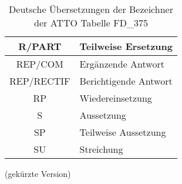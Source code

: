 \begin{table}[h]
\begin{tabular}{|c|l|}
            R/PART & Teilweise Ersetzung \\\hline
            REP/COM & Ergänzende Antwort \\\hline
            REP/RECTIF & Berichtigende Antwort \\\hline
            RP & Wiedereinsetzung \\\hline
            S & Aussetzung \\\hline
            SP & Teilweise Aussetzung \\\hline
            SU & Streichung \\\hline
        \end{tabular}
        \caption{Deutsche Übersetzungen der Bezeichner der ATTO Tabelle FD\_375}
        (gekürzte Version)
        \label{tab:fd_375}
    \end{table}




